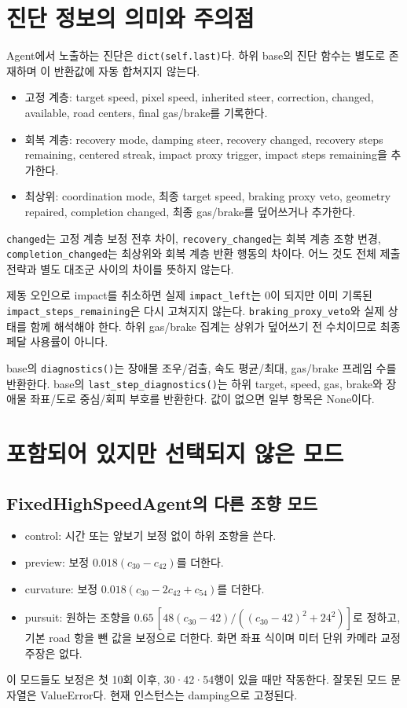 \documentclass[11pt,a4paper]{article}
\newcommand{\code}[1]{{\small\nolinkurl{#1}}}
\begin{document}
\section{진단 정보의 의미와 주의점}
Agent에서 노출하는 진단은 \code{dict(self.last)}다. 하위 base의 진단 함수는 별도로 존재하며 이 반환값에 자동 합쳐지지 않는다.
\begin{itemize}
\item 고정 계층: target speed, pixel speed, inherited steer, correction, changed, available, road centers, final gas/brake를 기록한다.
\item 회복 계층: recovery mode, damping steer, recovery changed, recovery steps remaining, centered streak, impact proxy trigger, impact steps remaining을 추가한다.
\item 최상위: coordination mode, 최종 target speed, braking proxy veto, geometry repaired, completion changed, 최종 gas/brake를 덮어쓰거나 추가한다.
\end{itemize}
\code{changed}는 고정 계층 보정 전후 차이, \code{recovery_changed}는 회복 계층 조향 변경, \code{completion_changed}는 최상위와 회복 계층 반환 행동의 차이다. 어느 것도 전체 제출 전략과 별도 대조군 사이의 차이를 뜻하지 않는다.

제동 오인으로 impact를 취소하면 실제 \code{impact_left}는 0이 되지만 이미 기록된 \code{impact_steps_remaining}은 다시 고쳐지지 않는다. \code{braking_proxy_veto}와 실제 상태를 함께 해석해야 한다. 하위 gas/brake 집계는 상위가 덮어쓰기 전 수치이므로 최종 페달 사용률이 아니다.

base의 \code{diagnostics()}는 장애물 조우/검출, 속도 평균/최대, gas/brake 프레임 수를 반환한다. base의 \code{last_step_diagnostics()}는 하위 target, speed, gas, brake와 장애물 좌표/도로 중심/회피 부호를 반환한다. 값이 없으면 일부 항목은 None이다.

\section{포함되어 있지만 선택되지 않은 모드}
\subsection{FixedHighSpeedAgent의 다른 조향 모드}
\begin{itemize}
\item control: 시간 또는 앞보기 보정 없이 하위 조향을 쓴다.
\item preview: 보정 $0.018(c_{30}-c_{42})$를 더한다.
\item curvature: 보정 $0.018(c_{30}-2c_{42}+c_{54})$를 더한다.
\item pursuit: 원하는 조향을 $0.65\,[48(c_{30}-42)/((c_{30}-42)^2+24^2)]$로 정하고, 기본 road 항을 뺀 값을 보정으로 더한다. 화면 좌표 식이며 미터 단위 카메라 교정 주장은 없다.
\end{itemize}
이 모드들도 보정은 첫 10회 이후, 30·42·54행이 있을 때만 작동한다. 잘못된 모드 문자열은 ValueError다. 현재 인스턴스는 damping으로 고정된다.
\end{document}
